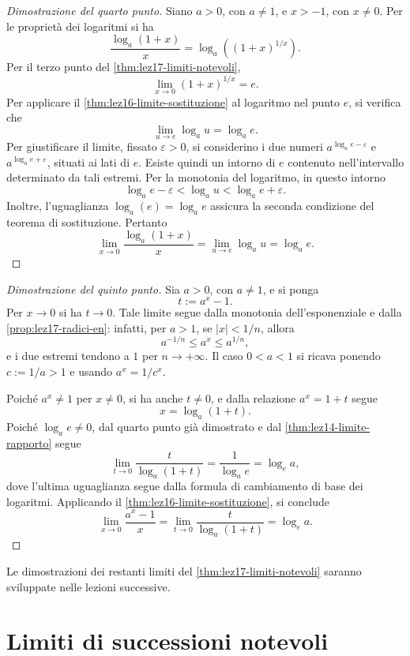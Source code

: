 \begin{proof}[Dimostrazione del quarto punto]
Siano \(a>0\), con \(a\ne1\), e \(x>-1\), con
\(x\ne0\). Per le proprietà dei logaritmi si ha
\[
  \frac{\log_a(1+x)}{x}
  =\log_a\left((1+x)^{1/x}\right).
\]
Per il terzo punto del \cref{thm:lez17-limiti-notevoli},
\[
  \lim_{x\to0}(1+x)^{1/x}=e.
\]
Per applicare il \cref{thm:lez16-limite-sostituzione}
al logaritmo nel punto \(e\), si verifica che
\[
  \lim_{u\to e}\log_a u=\log_a e.
\]
Per giustificare il limite, fissato
\(\varepsilon>0\), si considerino i due numeri
\(a^{\log_a e-\varepsilon}\) e
\(a^{\log_a e+\varepsilon}\), situati ai lati di
\(e\). Esiste quindi un intorno di \(e\) contenuto
nell'intervallo determinato da tali estremi.
Per la monotonia del logaritmo, in questo intorno
\[
  \log_a e-\varepsilon<\log_a u
  <\log_a e+\varepsilon.
\]
Inoltre, l'uguaglianza \(\log_a(e)=\log_a e\)
assicura la seconda condizione del teorema di sostituzione.
Pertanto
\[
  \lim_{x\to0}\frac{\log_a(1+x)}{x}
  =\lim_{u\to e}\log_a u=\log_a e.
\]
\end{proof}

\begin{proof}[Dimostrazione del quinto punto]
Sia \(a>0\), con \(a\ne1\), e si ponga
\[
  t:=a^x-1.
\]
Per \(x\to0\) si ha \(t\to0\). Tale limite segue
dalla monotonia dell'esponenziale e dalla
\cref{prop:lez17-radici-en}: infatti, per \(a>1\),
se \(|x|<1/n\), allora
\[
  a^{-1/n}\le a^x\le a^{1/n},
\]
e i due estremi tendono a \(1\) per \(n\to+\infty\).
Il caso \(0<a<1\) si ricava ponendo \(c:=1/a>1\)
e usando \(a^x=1/c^x\).

Poiché \(a^x\ne1\) per \(x\ne0\), si ha anche
\(t\ne0\), e dalla relazione \(a^x=1+t\) segue
\[
  x=\log_a(1+t).
\]
Poiché \(\log_a e\ne0\), dal quarto punto già dimostrato
e dal \cref{thm:lez14-limite-rapporto} segue
\[
  \lim_{t\to0}\frac{t}{\log_a(1+t)}
  =\frac1{\log_a e}=\log_e a,
\]
dove l'ultima uguaglianza segue dalla formula di
cambiamento di base dei logaritmi.
Applicando il \cref{thm:lez16-limite-sostituzione},
si conclude
\[
  \lim_{x\to0}\frac{a^x-1}{x}
  =\lim_{t\to0}\frac{t}{\log_a(1+t)}
  =\log_e a.
\]
\end{proof}

Le dimostrazioni dei restanti limiti del
\cref{thm:lez17-limiti-notevoli} saranno sviluppate
nelle lezioni successive.

\clearpage

\section{Limiti di successioni notevoli}
\label{sec:lez17-limiti-successioni-notevoli}

